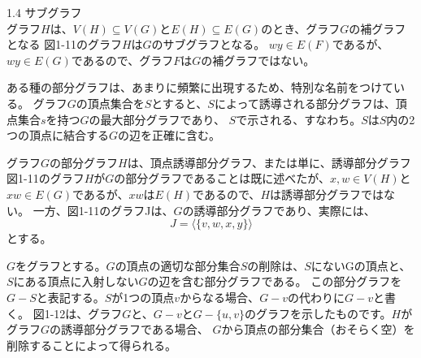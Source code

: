 
1.4 サブグラフ\\
グラフ$H$は、$V(H) \subseteq  V(G)$と$E(H) \subseteq E(G)$のとき、グラフ$G$の補グラフとなる 図1-11のグラフ$H$は$G$のサブグラフとなる。
$wy \in E(F)$であるが、$wy \in E(G)$であるので、グラフ$F$は$G$の補グラフではない。

ある種の部分グラフは、あまりに頻繁に出現するため、特別な名前をつけている。
グラフ$G$の頂点集合を$S$とすると、$S$によって誘導される部分グラフは、頂点集合$s$を持つ$G$の最大部分グラフであり、
$S$で示される、すなわち。$S$は$S$内の2つの頂点に結合する$G$の辺を正確に含む。

グラフ$G$の部分グラフ$H$は、頂点誘導部分グラフ、または単に、誘導部分グラフ
図1-11のグラフ$H$が$G$の部分グラフであることは既に述べたが、$x, w \in V(H)$と$xw \in E(G)$であるが、$xw$は$E(H)$であるので、$H$は誘導部分グラフではない。
一方、図1-11のグラフJは、$G$の誘導部分グラフであり、実際には、$$J= \langle {\{v, w, x, y\}} \rangle $$とする。


$G$をグラフとする。$G$の頂点の適切な部分集合$S$の削除は、$S$にないGの頂点と、$S$にある頂点に入射しない$G$の辺を含む部分グラフである。
この部分グラフを$G - S$と表記する。$S$が1つの頂点$v$からなる場合、$G - {v}$の代わりに$G - v$と書く。
図1-12は、グラフ$G$と、$G - v$と$G - \{u, v\}$のグラフを示したものです。$H$がグラフ$G$の誘導部分グラフである場合、
$G$から頂点の部分集合（おそらく空）を削除することによって得られる。